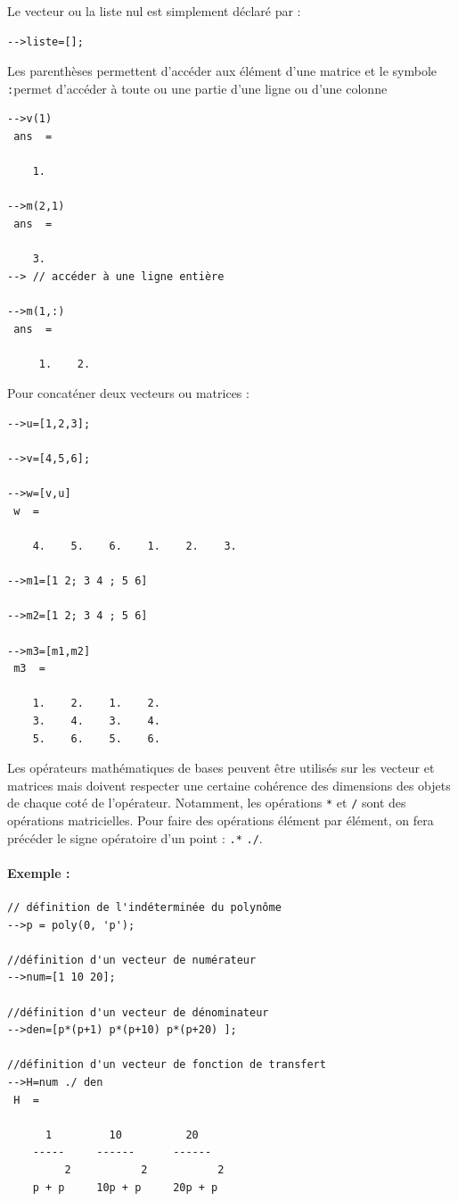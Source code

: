 Le vecteur ou la liste nul est simplement déclaré par :
\begin{code}
\begin{verbatim}
-->liste=[];
\end{verbatim}
\end{code}


Les parenthèses permettent d'accéder aux élément d'une matrice et le 
symbole \og\verb?:?\fg permet d'accéder à toute ou une partie d'une ligne ou d'une colonne
\begin{code}
\begin{verbatim}
-->v(1)
 ans  =
 
    1.  

-->m(2,1)
 ans  =
 
    3.  
--> // accéder à une ligne entière
 
-->m(1,:)
 ans  =
   
     1.    2. 
\end{verbatim}
\end{code}

\newpage
Pour concaténer deux vecteurs ou matrices :
\begin{code}
\begin{verbatim}
-->u=[1,2,3];
 
-->v=[4,5,6];
 
-->w=[v,u]
 w  =
 
    4.    5.    6.    1.    2.    3.

-->m1=[1 2; 3 4 ; 5 6]
 
-->m2=[1 2; 3 4 ; 5 6]
 
-->m3=[m1,m2]
 m3  =
 
    1.    2.    1.    2.  
    3.    4.    3.    4.  
    5.    6.    5.    6. 
\end{verbatim}
\end{code}

Les opérateurs mathématiques de bases peuvent être utilisés 
sur les vecteur et matrices mais doivent respecter une certaine cohérence des dimensions 
des objets de chaque coté de l'opérateur. Notamment, les opérations \verb?*? et \verb?/? sont
des opérations matricielles. Pour faire des opérations élément par élément,
on fera précéder le signe opératoire d'un point : \verb?.*? \verb?./?.

\paragraph{Exemple :}
\begin{code}
\begin{verbatim}
// définition de l'indéterminée du polynôme
-->p = poly(0, 'p');

//définition d'un vecteur de numérateur
-->num=[1 10 20];

//définition d'un vecteur de dénominateur
-->den=[p*(p+1) p*(p+10) p*(p+20) ];

//définition d'un vecteur de fonction de transfert
-->H=num ./ den
 H  =
 
      1         10          20      
    -----     ------      ------    
         2           2           2  
    p + p     10p + p     20p + p   
\end{verbatim}
\end{code}

